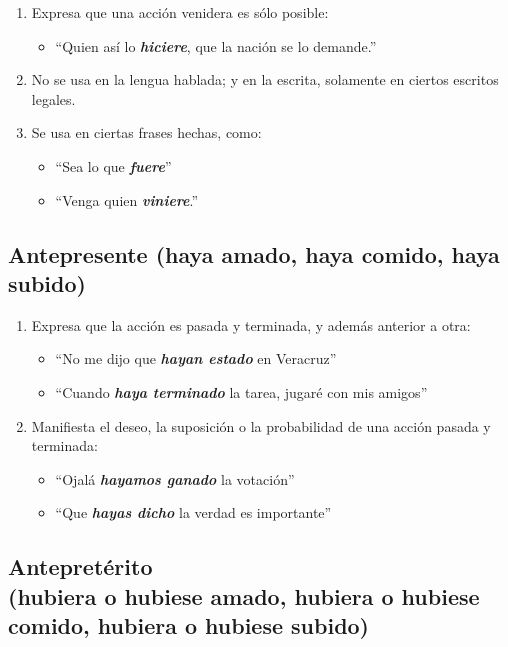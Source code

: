 \documentclass[14pt]{extarticle}
\newcommand{\marcatexto}[1]{\textbf{\textit{#1}}}
\begin{document}
\begin{enumerate}[label=\alph*)]
\item Expresa que una acción venidera es sólo posible:
\begin{itemize}
\item \enquote{Quien así lo \marcatexto{hiciere}, que la nación se lo demande.}
\end{itemize}
\item No se usa en la lengua hablada; y en la escrita, solamente en ciertos escritos legales.
\item Se usa en ciertas frases hechas, como:
\begin{itemize}
\item \enquote{Sea lo que \marcatexto{fuere}}
\item \enquote{Venga quien \marcatexto{viniere}.}
\end{itemize}
\end{enumerate}

\subsection{Antepresente (haya amado, haya comido, haya subido)}

\begin{enumerate}[label=\alph*)]
\item Expresa que la acción es pasada y terminada, y además anterior a otra:
\begin{itemize}
\item \enquote{No me dijo que \marcatexto{hayan estado} en Veracruz}
\item \enquote{Cuando \marcatexto{haya terminado} la tarea, jugaré con mis amigos}
\end{itemize}
\item Manifiesta el deseo, la suposición o la probabilidad de una acción pasada y terminada:
\begin{itemize}
\item \enquote{Ojalá \marcatexto{hayamos ganado} la votación}
\item \enquote{Que \marcatexto{hayas dicho} la verdad es importante}
\end{itemize}
\end{enumerate}

\subsection{Antepretérito \\ (hubiera o hubiese amado, hubiera o hubiese comido, hubiera o hubiese subido)}
\end{document}

